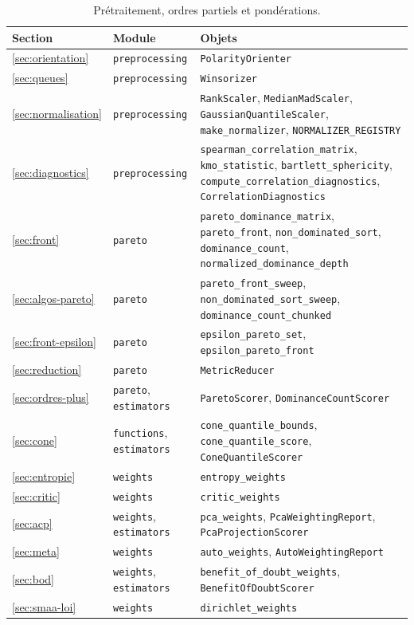\documentclass[11pt,a4paper]{article}
\theoremstyle{definition}
\theoremstyle{remark}
\begin{document}
\begin{table}[htbp]
  \centering
  \small
  \renewcommand{\arraystretch}{1.2}
  \begin{tabularx}{\textwidth}{@{}l l Y@{}}
    \toprule
    \textbf{Section} & \textbf{Module} & \textbf{Objets} \\
    \midrule
    \ref{sec:orientation} & \texttt{preprocessing}
      & \texttt{PolarityOrienter} \\
    \ref{sec:queues} & \texttt{preprocessing}
      & \texttt{Winsorizer} \\
    \ref{sec:normalisation} & \texttt{preprocessing}
      & \texttt{RankScaler}, \texttt{MedianMadScaler},
        \texttt{GaussianQuantileScaler}, \texttt{make\_normalizer},
        \texttt{NORMALIZER\_REGISTRY} \\
    \ref{sec:diagnostics} & \texttt{preprocessing}
      & \texttt{spearman\_correlation\_matrix}, \texttt{kmo\_statistic},
        \texttt{bartlett\_sphericity}, \texttt{compute\_correlation\_diagnostics},
        \texttt{CorrelationDiagnostics} \\
    \addlinespace
    \ref{sec:front} & \texttt{pareto}
      & \texttt{pareto\_dominance\_matrix}, \texttt{pareto\_front},
        \texttt{non\_dominated\_sort}, \texttt{dominance\_count},
        \texttt{normalized\_dominance\_depth} \\
    \ref{sec:algos-pareto} & \texttt{pareto}
      & \texttt{pareto\_front\_sweep}, \texttt{non\_dominated\_sort\_sweep},
        \texttt{dominance\_count\_chunked} \\
    \ref{sec:front-epsilon} & \texttt{pareto}
      & \texttt{epsilon\_pareto\_set}, \texttt{epsilon\_pareto\_front} \\
    \ref{sec:reduction} & \texttt{pareto}
      & \texttt{MetricReducer} \\
    \ref{sec:ordres-plus} & \texttt{pareto}, \texttt{estimators}
      & \texttt{ParetoScorer}, \texttt{DominanceCountScorer} \\
    \ref{sec:cone} & \texttt{functions}, \texttt{estimators}
      & \texttt{cone\_quantile\_bounds}, \texttt{cone\_quantile\_score},
        \texttt{ConeQuantileScorer} \\
    \addlinespace
    \ref{sec:entropie} & \texttt{weights} & \texttt{entropy\_weights} \\
    \ref{sec:critic} & \texttt{weights} & \texttt{critic\_weights} \\
    \ref{sec:acp} & \texttt{weights}, \texttt{estimators}
      & \texttt{pca\_weights}, \texttt{PcaWeightingReport},
        \texttt{PcaProjectionScorer} \\
    \ref{sec:meta} & \texttt{weights}
      & \texttt{auto\_weights}, \texttt{AutoWeightingReport} \\
    \ref{sec:bod} & \texttt{weights}, \texttt{estimators}
      & \texttt{benefit\_of\_doubt\_weights}, \texttt{BenefitOfDoubtScorer} \\
    \ref{sec:smaa-loi} & \texttt{weights} & \texttt{dirichlet\_weights} \\
    \bottomrule
  \end{tabularx}
  \caption{Prétraitement, ordres partiels et pondérations.}
  \label{tab:code-1}
\end{table}
\end{document}
